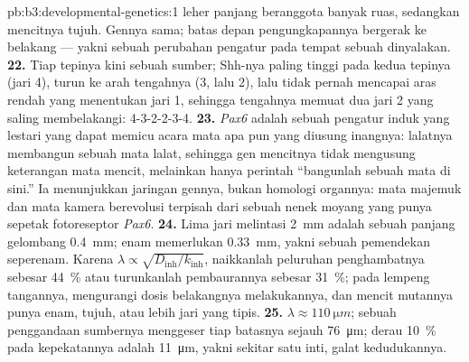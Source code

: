 \begin{solution}{pb:b3:developmental-genetics:1}
leher panjang beranggota banyak ruas, sedangkan mencitnya tujuh. Gennya sama;
batas depan pengungkapannya bergerak ke belakang --- yakni sebuah perubahan
pengatur pada tempat sebuah  dinyalakan.
\textbf{22.} Tiap tepinya kini sebuah sumber; Shh-nya paling tinggi pada kedua tepinya
(jari 4), turun ke arah tengahnya (3, lalu 2), lalu tidak pernah mencapai aras
rendah yang menentukan jari 1, sehingga tengahnya memuat dua jari 2 yang saling
membelakangi: 4-3-2-2-3-4.
\textbf{23.} \emph{Pax6} adalah sebuah pengatur induk yang lestari yang dapat
memicu acara mata apa pun yang diusung inangnya: lalatnya membangun sebuah mata
lalat, sehingga gen mencitnya tidak mengusung keterangan mata mencit, melainkan hanya
perintah ``bangunlah sebuah mata di sini.'' Ia menunjukkan  jaringan
gennya, bukan homologi organnya: mata majemuk dan mata kamera
berevolusi terpisah dari sebuah nenek moyang yang punya sepetak fotoreseptor
\emph{Pax6}.
\textbf{24.} Lima jari melintasi \qty{2}{mm} adalah sebuah panjang gelombang
\qty{0.4}{mm}; enam memerlukan \qty{0.33}{mm}, yakni sebuah pemendekan seperenam.
Karena $\lambda \propto \sqrt{D_{\text{inh}}/k_{\text{inh}}}$, naikkanlah
peluruhan penghambatnya sebesar \qty{44}{\%} atau turunkanlah pembaurannya sebesar
\qty{31}{\%}; pada lempeng tangannya, mengurangi dosis  belakangnya
melakukannya, dan mencit mutannya punya enam, tujuh, atau lebih jari yang
tipis.
\textbf{25.} $\lambda \approx \qty{110}{\micro m}$; sebuah penggandaan
sumbernya menggeser tiap batasnya sejauh \qty{76}{\micro m}; derau \qty{10}{\%}
pada kepekatannya adalah \qty{11}{\micro m}, yakni sekitar satu inti, galat
kedudukannya.
\end{solution}
